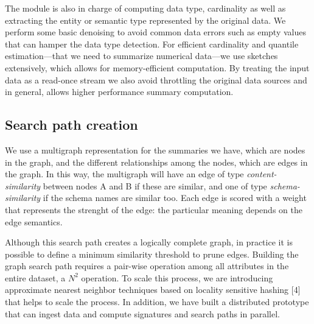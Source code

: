 The module is also in charge of computing data type, cardinality as well as
extracting the entity or semantic type represented by the original data. We
perform some basic denoising to avoid common data errors such as empty values
that can hamper the data type detection. For efficient cardinality and quantile
estimation---that we need to summarize numerical data---we use sketches
extensively, which allows for memory-efficient computation. By treating the
input data as a read-once stream we also avoid throttling the original data
sources and in general, allows higher performance summary computation.

\subsection{Search path creation}

We use a multigraph representation for the summaries we have, which are nodes in
the graph, and the different relationships among the nodes, which are edges in
the graph. In this way, the multigraph will have an edge of type
\emph{content-similarity} between nodes A and B if these are similar, and one of
type \emph{schema-similarity} if the schema names are similar too. Each edge is
scored with a weight that represents the strenght of the edge: the particular
meaning depends on the edge semantics.

Although this search path creates a logically complete graph, in practice it is
possible to define a minimum similarity threshold to prune edges. Building the
graph search path requires a pair-wise operation among all attributes in the
entire dataset, a $N^2$ operation. To scale this process, we are introducing
approximate nearest neighbor techniques based on locality sensitive hashing [4]
that helps to scale the process. In addition, we have built a distributed
prototype that can ingest data and compute signatures and search paths in
parallel.



